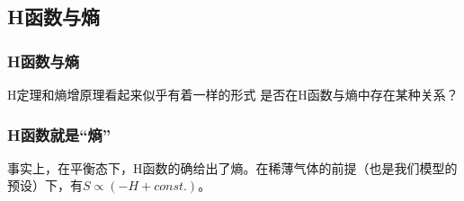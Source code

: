 \documentclass{if-beamer}
\begin{document}
\subsection{H函数与熵}
\begin{frame}
    \frametitle{H函数与熵}
        H定理和熵增原理看起来似乎有着一样的形式
        是否在H函数与熵中存在某种关系？
        
    

\end{frame}
\begin{frame}
    \frametitle{H函数就是“熵”}
        事实上，在平衡态下，H函数的确给出了熵。在稀薄气体的前提（也是我们模型的预设）下，有$S\propto(-H+const.)$。                                                                                                                                                                                                                                                                          
        
    

\end{frame}
\end{document}
